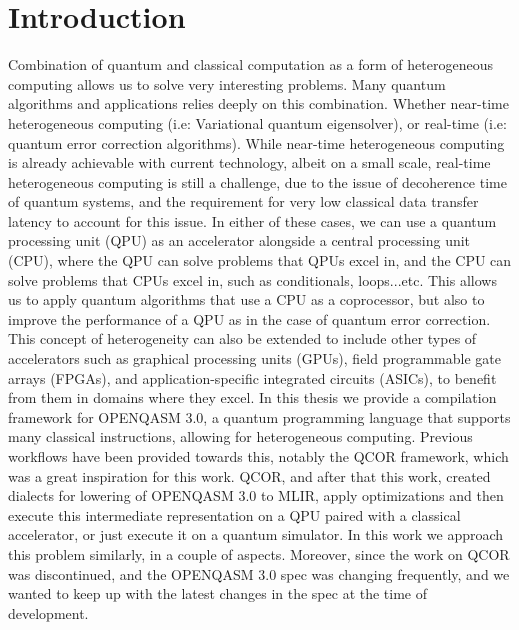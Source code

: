 \chapter{Introduction}
\label{chapter:Introduction}
Combination of quantum and classical computation as a form of heterogeneous computing allows us
to solve very interesting problems. Many quantum algorithms and applications relies
deeply on this combination. Whether near-time heterogeneous computing (i.e: Variational quantum eigensolver),
or real-time (i.e: quantum error correction algorithms). While near-time heterogeneous computing
is already achievable with current technology, albeit on a small scale, 
real-time heterogeneous computing is still a
challenge,
due to the issue of decoherence time of quantum systems, and the requirement for
very low classical data transfer latency to account for this issue. In either
of these cases, we can use a quantum processing unit (QPU) as an accelerator
alongside a central processing unit (CPU), where the QPU can solve problems that QPUs excel in, and the
CPU can solve problems that CPUs excel in, such as conditionals, loops...etc.
This allows us to apply quantum algorithms that use a CPU as a coprocessor,
but also to improve the performance of a QPU as in the case of quantum error
correction.  This concept of heterogeneity can also be extended to include
other types of accelerators such as graphical processing units (GPUs), 
field programmable gate arrays (FPGAs), and application-specific integrated circuits (ASICs), to benefit from them
in domains where they excel. In this thesis we provide a compilation 
framework for OPENQASM 3.0, a quantum programming language that supports many classical instructions,
allowing for heterogeneous computing. Previous workflows have been provided towards this,
notably the QCOR framework, which was a great inspiration for this work. QCOR, and after that this work,
created dialects for lowering of OPENQASM 3.0 to MLIR, apply optimizations and then
execute this intermediate representation on a QPU paired with a classical accelerator, or just execute it 
on a quantum simulator.
In this work we approach this problem similarly, in a couple of aspects. Moreover, 
since the work on QCOR was discontinued, and the OPENQASM 3.0 spec was changing
frequently, and we wanted to keep up with the latest changes in the spec at the time of development.
